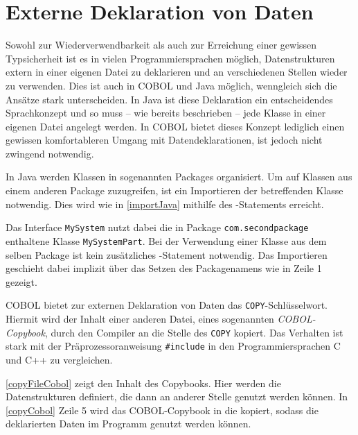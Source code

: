 \section{Externe Deklaration von Daten} \label{copy}
Sowohl zur Wiederverwendbarkeit als auch zur Erreichung einer gewissen Typsicherheit ist es in vielen Programmiersprachen möglich, Datenstrukturen extern in einer eigenen Datei zu deklarieren und an verschiedenen Stellen wieder zu verwenden. Dies ist auch in COBOL und Java möglich, wenngleich sich die Ansätze stark unterscheiden. In Java ist diese Deklaration ein entscheidendes Sprachkonzept und so muss -- wie bereits beschrieben -- jede Klasse in einer eigenen Datei angelegt werden. In COBOL bietet dieses Konzept lediglich einen gewissen komfortableren Umgang mit Datendeklarationen, ist jedoch nicht zwingend notwendig.

In Java werden Klassen in sogenannten Packages organisiert. Um auf Klassen aus einem anderen Package zuzugreifen, ist ein Importieren der betreffenden Klasse notwendig. Dies wird wie in \autoref{importJava} mithilfe des -Statements erreicht.


Das Interface \texttt{MySystem} nutzt dabei die in Package \texttt{com.secondpackage} enthaltene Klasse \texttt{MySystemPart}. Bei der Verwendung einer Klasse aus dem selben Package ist kein zusätzliches -Statement notwendig. Das Importieren geschieht dabei implizit über das Setzen des Packagenamens wie in Zeile 1 gezeigt.

COBOL bietet zur externen Deklaration von Daten das \texttt{COPY}-Schlüsselwort. Hiermit wird der Inhalt einer anderen Datei, eines sogenannten \textit{COBOL-Copybook}, durch den Compiler an die Stelle des \texttt{COPY} kopiert. Das Verhalten ist stark mit der Präprozessoranweisung \texttt{#include} in den Programmiersprachen C und C++ zu vergleichen.



\autoref{copyFileCobol} zeigt den Inhalt des Copybooks. Hier werden die Datenstrukturen definiert, die dann an anderer Stelle genutzt werden können. In \autoref{copyCobol} Zeile 5 wird das COBOL-Copybook in die  kopiert, sodass die deklarierten Daten im Programm genutzt werden können.

